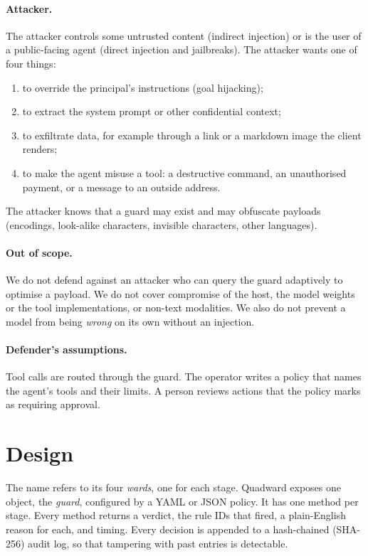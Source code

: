 \documentclass[10pt]{article}
\begin{document}
\paragraph{Attacker.} The attacker controls some untrusted content (indirect injection) or is the user of a public-facing agent (direct injection and jailbreaks). The attacker wants one of four things:
\begin{enumerate}[label=(\roman*)]
\item to override the principal's instructions (goal hijacking);
\item to extract the system prompt or other confidential context;
\item to exfiltrate data, for example through a link or a markdown image the client renders;
\item to make the agent misuse a tool: a destructive command, an unauthorised payment, or a message to an outside address.
\end{enumerate}
The attacker knows that a guard may exist and may obfuscate payloads (encodings, look-alike characters, invisible characters, other languages).

\paragraph{Out of scope.} We do not defend against an attacker who can query the guard adaptively to optimise a payload. We do not cover compromise of the host, the model weights or the tool implementations, or non-text modalities. We also do not prevent a model from being \emph{wrong} on its own without an injection.

\paragraph{Defender's assumptions.} Tool calls are routed through the guard. The operator writes a policy that names the agent's tools and their limits. A person reviews actions that the policy marks as requiring approval.

\section{Design}
\label{sec:design}
The name refers to its four \emph{wards}, one for each stage. Quadward exposes one object, the \emph{guard}, configured by a YAML or JSON policy. It has one method per stage. Every method returns a verdict, the rule IDs that fired, a plain-English reason for each, and timing. Every decision is appended to a hash-chained (SHA-256) audit log, so that tampering with past entries is detectable.
\end{document}
